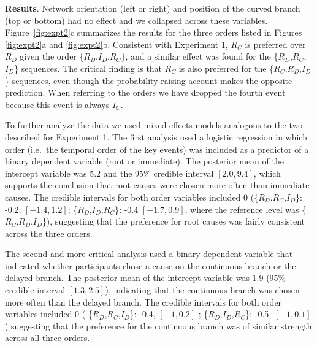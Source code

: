 \documentclass[10pt,letterpaper]{article}
\newcommand{\ev}[2]{$#1_#2$}
\begin{document}


\textbf{Results}.  
Network orientation (left or right) and position of the curved branch (top or bottom) had no effect and we collapsed across these variables.  Figure~\ref{fig:expt2}c summarizes the results for the three orders listed in Figures \ref{fig:expt2}a and \ref{fig:expt2}b.  Consistent with Experiment 1,  \ev{R}{C} is preferred over \ev{R}{D} given the order \{\ev{R}{D},\ev{I}{D},\ev{R}{C}\}, and a similar effect was found for the \{\ev{R}{D},\ev{R}{C},\ev{I}{D}\} sequences. The critical finding is that \ev{R}{C} is also preferred for the \{\ev{R}{C},\ev{R}{D},\ev{I}{D}\} sequences, even though the probability raising account makes the opposite prediction. When referring to the orders we have dropped the fourth event because this event is always \ev{I}{C}.

To further analyze the data we used mixed effects models analogous to the two described for Experiment 1. The first analysis used a logistic regression in which order (i.e.\ the temporal order of the key events) was included as a predictor of a binary dependent variable (root or immediate).  The posterior mean of the intercept variable was 5.2 and the 95\% credible interval $[2.0, 9.4]$, which supports the conclusion that root causes were chosen more often than immediate causes. The credible intervals for both order variables included 0 (\{\ev{R}{D},\ev{R}{C},\ev{I}{D}\}: -0.2, $[-1.4,1.2]$; \{\ev{R}{D},\ev{I}{D},\ev{R}{C}\}: -0.4 $[-1.7,0.9]$, where the reference level was \{\ev{R}{C},\ev{R}{D},\ev{I}{D}\}), suggesting that the preference for root causes was fairly consistent across the three orders.

The second and more critical analysis used a binary dependent variable that indicated whether participants chose a cause on the continuous branch or the delayed branch.  The posterior mean of the intercept variable was 1.9 (95\% credible interval $[1.3, 2.5]$), indicating that the continuous branch was chosen more often than the delayed branch.  The credible intervals for both order variables included 0 ( \{\ev{R}{D},\ev{R}{C},\ev{I}{D}\}: -0.4, $[-1,0.2]$ ; \{\ev{R}{D},\ev{I}{D},\ev{R}{C}\}: -0.5, $[-1,0.1]$) suggesting that the preference for the continuous branch was of similar strength across all three orders. 
\end{document}
